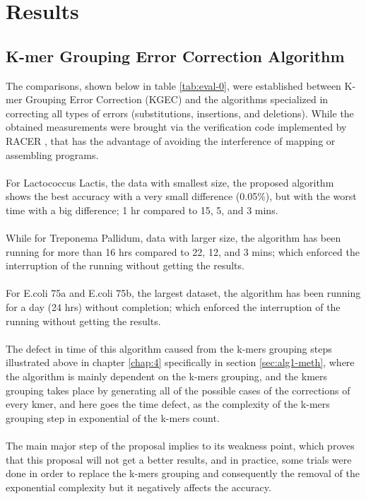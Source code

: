 \documentclass[12pt,openany]{llncs}
\begin{document}
\section{Results}
\subsection{\label{subsec:eval1-res}K-mer Grouping Error Correction Algorithm}
The comparisons, shown below in table \ref{tab:eval-0}, were established between K-mer Grouping Error Correction (KGEC) and the algorithms specialized in correcting all types of errors (substitutions, insertions, and deletions). While the obtained measurements were brought via the verification code implemented by RACER \cite{Racer}, that has the advantage of avoiding the interference of mapping or assembling programs. 
\\\\
For Lactococcus Lactis, the data with smallest size, the proposed algorithm shows the best accuracy with a very small difference (0.05\%), but with the worst time with a big difference; 1 hr compared to 15, 5, and 3 mins.
\\
\\
While for Treponema Pallidum, data with larger size, the algorithm has been running for more than 16 hrs compared to 22, 12, and 3 mins; which enforced the interruption of the running without getting the results.
\\
\\
For E.coli 75a and E.coli 75b, the largest dataset, the algorithm has been running for a day (24 hrs) without completion; which enforced the interruption of the running without getting the results.
\\
\\
The defect in time of this algorithm caused from the k-mers grouping steps illustrated above in chapter \ref{chap:4} specifically in section \ref{sec:alg1-meth}, where the algorithm is mainly dependent on the k-mers grouping, and the kmers grouping takes place by generating all of the possible cases of the corrections of every kmer, and here goes the time defect, as the complexity of the k-mers grouping step in exponential of the k-mers count.
\\
\\
The main major step of the proposal implies to its weakness point, which proves that this proposal will not get a better results, and in practice, some trials were done in order to replace the k-mers grouping and consequently the removal of the exponential complexity but it negatively affects the accuracy.
\end{document}

